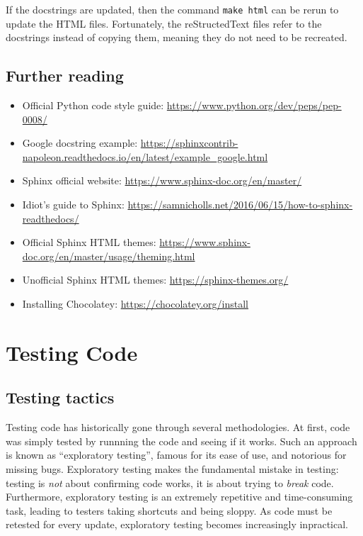 \documentclass[11pt]{article}
\begin{document}
If the docstrings are updated, then the command \texttt{make html} can be rerun to update the HTML files. Fortunately, the reStructedText files refer to the docstrings instead of copying them, meaning they do not need to be recreated.

\subsection{Further reading}

\begin{itemize}
    \item Official Python code style guide: \url{https://www.python.org/dev/peps/pep-0008/}
    \item Google docstring example: \url{https://sphinxcontrib-napoleon.readthedocs.io/en/latest/example_google.html}
    \item Sphinx official website: \url{https://www.sphinx-doc.org/en/master/}
    \item Idiot's guide to Sphinx: \url{https://samnicholls.net/2016/06/15/how-to-sphinx-readthedocs/}
    \item Official Sphinx HTML themes: \url{https://www.sphinx-doc.org/en/master/usage/theming.html}
    \item Unofficial Sphinx HTML themes: \url{https://sphinx-themes.org/}
    \item Installing Chocolatey: \url{https://chocolatey.org/install}
\end{itemize}

\newpage

\section{Testing Code}

\subsection{Testing tactics}

Testing code has historically gone through several methodologies. At first, code was simply tested by runnning the code and seeing if it works. Such an approach is known as ``exploratory testing'', famous for its ease of use, and notorious for missing bugs. Exploratory testing makes the fundamental mistake in testing: testing is \textit{not} about confirming code works, it is about trying to \textit{break} code. Furthermore, exploratory testing is an extremely repetitive and time-consuming task, leading to testers taking shortcuts and being sloppy. As code must be retested for every update, exploratory testing becomes increasingly inpractical.
\end{document}
